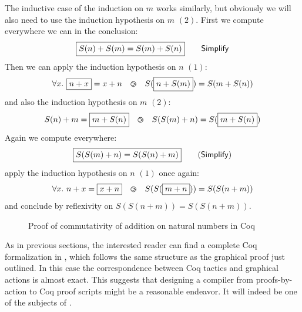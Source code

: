 The inductive case of the induction on $m$ works similarly, but obviously we
will also need to use the induction hypothesis on $m$ $(2)$. First we compute
everywhere we can in the conclusion:
$$\fbox{$S(n) + S(m) = S(m) + S(n)$} \qquad \text{\textsf{Simplify}}$$
Then we can apply the induction hypothesis on $n$ $(1)$:
$$\forall x.\ \fbox{$n + x$} = x + n ~~\operatorname{\,\varogreaterthan\,}~~ S(\fbox{$n + S(m)$}) = S(m + S(n))$$
and also the induction hypothesis on $m$ $(2)$:
$$S(n) + m = \fbox{$m + S(n)$} ~~\operatorname{\,\varogreaterthan\,}~~ S(S(m) + n) = S(\fbox{$m + S(n)$})$$
Again we compute everywhere:
$$\fbox{$S(S(m) + n) = S(S(n) + m)$} \qquad \text{(\textsf{Simplify})}$$
apply the induction hypothesis on $n$ $(1)$ once again:
$$\forall x.\ n + x = \fbox{$x + n$} ~~\operatorname{\,\varogreaterthan\,}~~ S(S(\fbox{$m + n$})) = S(S(n + m))$$
and conclude by reflexivity on $S(S(n + m)) = S(S(n + m))$.

\begin{figure}
  
  \caption{Proof of commutativity of addition on natural numbers in Coq}
\end{figure}

As in previous sections, the interested reader can find a complete Coq
formalization in , which follows the same structure as the
graphical proof just outlined. In this case the correspondence between Coq
tactics and graphical actions is almost exact. This suggests that designing a
compiler from proofs-by-action to Coq proof scripts might be a reasonable
endeavor. It will indeed be one of the subjects of .